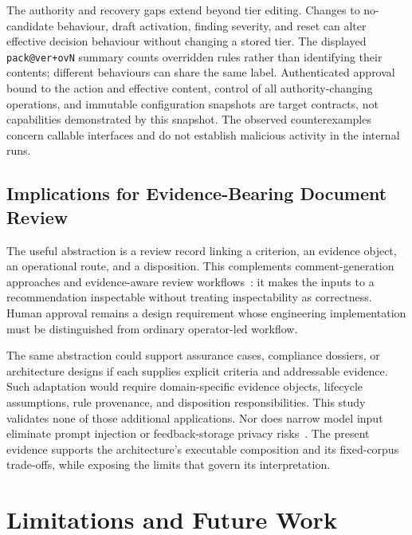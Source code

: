\documentclass[computers,article,submit,moreauthors]{Definitions/mdpi}
\begin{document}
The authority and recovery gaps extend beyond tier editing. Changes to no-candidate behaviour, draft activation, finding severity, and reset can alter effective decision behaviour without changing a stored tier. The displayed \texttt{pack@ver+ovN} summary counts overridden rules rather than identifying their contents; different behaviours can share the same label. Authenticated approval bound to the action and effective content, control of all authority-changing operations, and immutable configuration snapshots are target contracts, not capabilities demonstrated by this snapshot. The observed counterexamples concern callable interfaces and do not establish malicious activity in the internal runs.

\subsection{Implications for Evidence-Bearing Document Review}

The useful abstraction is a review record linking a criterion, an evidence object, an operational route, and a disposition. This complements comment-generation approaches and evidence-aware review workflows~\cite{alsawalqah2026,pornprasit2024}: it makes the inputs to a recommendation inspectable without treating inspectability as correctness. Human approval remains a design requirement whose engineering implementation must be distinguished from ordinary operator-led workflow.

The same abstraction could support assurance cases, compliance dossiers, or architecture designs if each supplies explicit criteria and addressable evidence. Such adaptation would require domain-specific evidence objects, lifecycle assumptions, rule provenance, and disposition responsibilities. This study validates none of those additional applications. Nor does narrow model input eliminate prompt injection or feedback-storage privacy risks~\cite{shi2024inject,mempriv2025}. The present evidence supports the architecture's executable composition and its fixed-corpus trade-offs, while exposing the limits that govern its interpretation.

\section{Limitations and Future Work}\label{sec:limitations}
\end{document}
